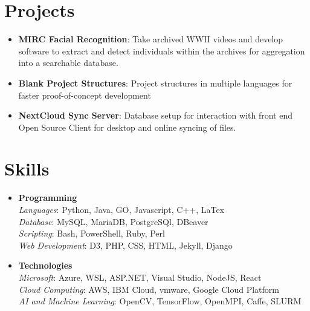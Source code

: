 \documentclass[letterpaper,11pt]{article}
\newcommand{\resumeItem}[2]{
	\item\small{
		\textbf{#1}{: #2 \vspace{-2pt}}
  }
}
\newcommand{\resumeSubItem}[2]{\resumeItem{#1}{#2}\vspace{-4pt}}
\newcommand{\resumeSubHeadingListStart}{\begin{itemize}[leftmargin=*]}
\newcommand{\resumeSubHeadingListEnd}{\end{itemize}}
\begin{document}
\section{Projects}
	\resumeSubHeadingListStart
		\resumeSubItem{MIRC Facial Recognition}
			{Take archived WWII videos and develop software to extract and detect individuals within the archives for aggregation into a searchable database.}
		\resumeSubItem{Blank Project Structures}
			{Project structures in multiple languages for faster proof-of-concept development}
		\resumeSubItem{NextCloud Sync Server}
			{Database setup for interaction with front end Open Source Client for desktop and online syncing of files.}
  \resumeSubHeadingListEnd

\section{Skills}
	\resumeSubHeadingListStart
		\item {
			\textbf{Programming}\\
			\textit{Languages}{: Python, Java, GO, Javascript, C++, LaTex}\\
			\textit{Database}{: MySQL, MariaDB, PostgreSQl, DBeaver}\\
			\textit{Scripting}{: Bash, PowerShell, Ruby, Perl}\\
			\textit{Web Development}{: D3, PHP, CSS, HTML, Jekyll, Django}\\
		}
		\item {
			\textbf{Technologies}\\
			\textit{Microsoft}{: Azure, WSL, ASP.NET, Visual Studio, NodeJS, React}\\
			\textit{Cloud Computing}{: AWS, IBM Cloud, vmware, Google Cloud Platform}\\
			\textit{AI and Machine Learning}{: OpenCV, TensorFlow, OpenMPI, Caffe, SLURM}\\
		}
	\resumeSubHeadingListEnd

\end{document}
